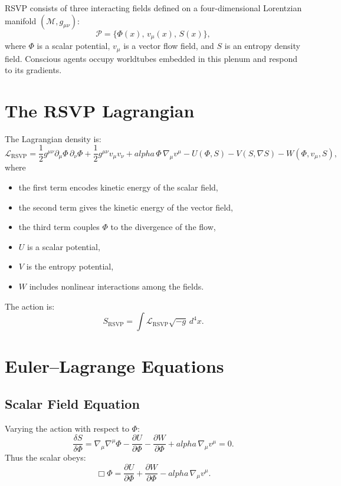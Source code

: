 \documentclass[12pt,oneside]{book}
\theoremstyle{plain}
\theoremstyle{definition}
\def\alpha{alpha}%
\begin{document}
RSVP consists of three interacting fields defined on a
four-dimensional Lorentzian manifold $(\mathcal{M}, g_{\mu\nu})$:
\[
\mathcal{P} = \{ \Phi(x),\, v_\mu(x),\, S(x) \},
\]
where $\Phi$ is a scalar potential, $v_\mu$ is a vector flow field,
and $S$ is an entropy density field.
Conscious agents occupy worldtubes embedded in this plenum and
respond to its gradients.

\section{The RSVP Lagrangian}

The Lagrangian density is:
\begin{equation}
\label{eq:RSVP-Lagrangian}
\mathcal{L}_{\mathrm{RSVP}}
=
\frac{1}{2} g^{\mu\nu} \partial_\mu \Phi\, \partial_\nu \Phi
+ \frac{1}{2} g^{\mu\nu} v_\mu v_\nu
+ \alpha\, \Phi\, \nabla_\mu v^\mu
- U(\Phi, S)
- V(S, \nabla S)
- W(\Phi, v_\mu, S),
\end{equation}
where
\begin{itemize}
    \item the first term encodes kinetic energy of the scalar field,
    \item the second term gives the kinetic energy of the vector field,
    \item the third term couples $\Phi$ to the divergence of the flow,
    \item $U$ is a scalar potential,
    \item $V$ is the entropy potential,
    \item $W$ includes nonlinear interactions among the fields.
\end{itemize}

The action is:
\[
S_{\mathrm{RSVP}} = \int \mathcal{L}_{\mathrm{RSVP}} \sqrt{-g}\, d^4x.
\]

\section{Euler--Lagrange Equations}

\subsection{Scalar Field Equation}

Varying the action with respect to $\Phi$:
\[
\frac{\delta S}{\delta \Phi}
=
\nabla_\mu \nabla^\mu \Phi
- \frac{\partial U}{\partial \Phi}
- \frac{\partial W}{\partial \Phi}
+ \alpha\, \nabla_\mu v^\mu
= 0.
\]
Thus the scalar obeys:
\begin{equation}
\label{eq:scalar-equation}
\Box \Phi
=
\frac{\partial U}{\partial \Phi}
+ \frac{\partial W}{\partial \Phi}
- \alpha\, \nabla_\mu v^\mu.
\end{equation}
\end{document}
